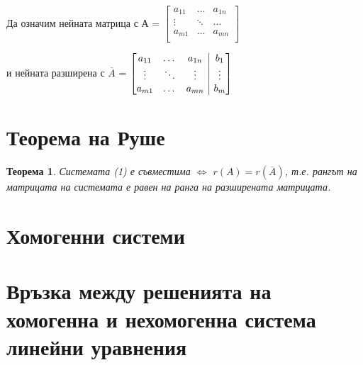 \documentclass[fleqn,12pt]{article}
\newtheorem*{Th}{Теорема}
\begin{document}
\begin{justify}
Да означим нейната матрица с А =
\begin{math}
    \begin{bmatrix}
        a_{11} & \dots & a_{1n} \\
        \vdots & \ddots & \dots \\
        a_{m1} & \dots & a_{mn} \\
    \end{bmatrix}
\end{math}

и нейната разширена с $\overline{A}$ = 
\begin{math}
\left[
\begin{array}{@{}ccc|c@{}}
    a_{11} & \dots & a_{1n} & b_1 \\
    \vdots & \ddots & \vdots & \vdots \\
    a_{m1} & \dots & a_{mn} & b_m \\
\end{array}
\right]
\end{math}

\section{Теорема на Руше}
\begin{Th}
    Системата (1) е съвместима $\iff$ $r(A) = r(\overline{A})$, т.е. рангът на матрицата на системата е равен на ранга 
    на разширената матрицата.
\end{Th}
\section{Хомогенни системи}
\section{Връзка между решенията на хомогенна и нехомогенна система линейни уравнения}


\end{justify}
\end{document}
